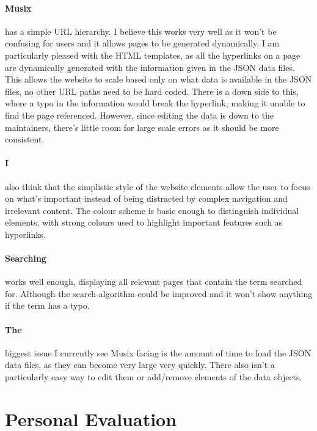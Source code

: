 \documentclass[10pt, a4paper]{article}
\begin{document}
    \paragraph{Musix} has a simple URL hierarchy. I believe this works very well as it won't be confusing for users and it allows pages to be generated dynamically. I am particularly pleased with the HTML templates, as all the hyperlinks on a page are dynamically generated with the information given in the JSON data files. This allows the website to scale based only on what data is available in the JSON files, no other URL paths need to be hard coded. There is a down side to this, where a typo in the information would break the hyperlink, making it unable to find the page referenced. However, since editing the data is down to the maintainers, there's little room for large scale errors as it should be more consistent.
    \paragraph{I} also think that the simplistic style of the website elements allow the user to focus on what's important instead of being distracted by complex navigation and irrelevant content. The colour scheme is basic enough to distinguish individual elements, with strong colours used to highlight important features such as hyperlinks.
    \paragraph{Searching} works well enough, displaying all relevant pages that contain the term searched for. Although the search algorithm could be improved and it won't show anything if the term has a typo.
    \paragraph{The} biggest issue I currently see Musix facing is the amount of time to load the JSON data files, as they can become very large very quickly. There also isn't a particularly easy way to edit them or add/remove elements of the data objects.
    
    \section{Personal Evaluation}
\end{document}
